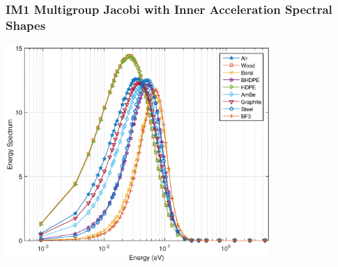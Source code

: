 \documentclass[compress,10pt]{beamer}
\newcommand{\backupend}{
    \setcounter{framenumber}{\value{finalframe}}
}
\begin{document}
\begin{frame}[t]
{}
{
\frametitle{\small IM1 Multigroup Jacobi with Inner Acceleration Spectral Shapes}
\hspace*{1.1cm}
\includegraphics[width=0.75\textwidth]{images/IM1_EC_MJIA.eps}
}
\end{frame}
\backupend
\end{document}
